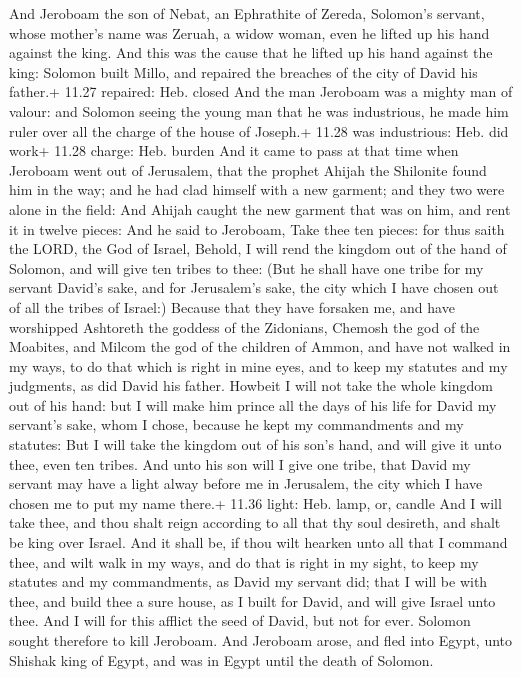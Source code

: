  And Jeroboam the son of Nebat, an Ephrathite of Zereda,
Solomon's servant, whose mother's name was Zeruah, a widow woman, even
he lifted up his hand against the king.  And this was the
cause that he lifted up his hand against the king: Solomon built Millo,
and repaired the breaches of the city of David his father.+ 11.27
repaired: Heb. closed  And the man Jeroboam was a mighty
man of valour: and Solomon seeing the young man that he was industrious,
he made him ruler over all the charge of the house of Joseph.+ 11.28 was
industrious: Heb. did work+ 11.28 charge: Heb. burden  And
it came to pass at that time when Jeroboam went out of Jerusalem, that
the prophet Ahijah the Shilonite found him in the way; and he had clad
himself with a new garment; and they two were alone in the field:
 And Ahijah caught the new garment that was on him, and
rent it in twelve pieces:  And he said to Jeroboam, Take
thee ten pieces: for thus saith the LORD, the God of Israel, Behold, I
will rend the kingdom out of the hand of Solomon, and will give ten
tribes to thee:  (But he shall have one tribe for my
servant David's sake, and for Jerusalem's sake, the city which I have
chosen out of all the tribes of Israel:)  Because that they
have forsaken me, and have worshipped Ashtoreth the goddess of the
Zidonians, Chemosh the god of the Moabites, and Milcom the god of the
children of Ammon, and have not walked in my ways, to do that which is
right in mine eyes, and to keep my statutes and my judgments, as did
David his father.  Howbeit I will not take the whole
kingdom out of his hand: but I will make him prince all the days of his
life for David my servant's sake, whom I chose, because he kept my
commandments and my statutes:  But I will take the kingdom
out of his son's hand, and will give it unto thee, even ten tribes.
 And unto his son will I give one tribe, that David my
servant may have a light alway before me in Jerusalem, the city which I
have chosen me to put my name there.+ 11.36 light: Heb. lamp, or, candle
 And I will take thee, and thou shalt reign according to
all that thy soul desireth, and shalt be king over Israel. 
And it shall be, if thou wilt hearken unto all that I command thee, and
wilt walk in my ways, and do that is right in my sight, to keep my
statutes and my commandments, as David my servant did; that I will be
with thee, and build thee a sure house, as I built for David, and will
give Israel unto thee.  And I will for this afflict the
seed of David, but not for ever.  Solomon sought therefore
to kill Jeroboam. And Jeroboam arose, and fled into Egypt, unto Shishak
king of Egypt, and was in Egypt until the death of Solomon.


